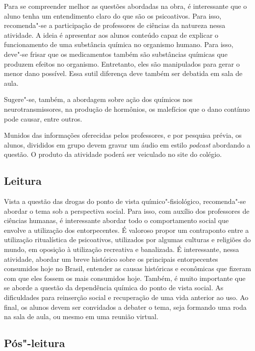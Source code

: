 \documentclass{article}
\begin{document}
Para se compreender melhor as questões abordadas na obra, é
interessante que o aluno tenha um entendimento claro do que são os
psicoativos. Para isso, recomenda"-se a participação de professores de
ciências da natureza nessa atividade. A ideia é apresentar aos alunos
conteúdo capaz de explicar o funcionamento de uma substância química no
organismo humano. Para isso, deve"-se frisar que os medicamentos também
são substâncias químicas que produzem efeitos no organismo. Entretanto,
eles são manipulados para gerar o menor dano possível. Essa sutil
diferença deve também ser debatida em sala de aula.

Sugere"-se, também, a abordagem sobre ação dos químicos nos
neurotransmissores, na produção de hormônios, os malefícios que o dano
contínuo pode causar, entre outros.

Munidos das informações oferecidas pelos professores, e por pesquisa
prévia, os alunos, divididos em grupo devem gravar um áudio em estilo
\emph{podcast} abordando a questão. O produto da atividade poderá ser
veiculado no site do colégio.

\subsection{Leitura}

Vista a questão das drogas do ponto de vista
químico"-fisiológico, recomenda"-se abordar o tema sob a perspectiva
social. Para isso, com auxílio dos professores de ciências humanas, é
interessante abordar todo o comportamento social que envolve a
utilização dos entorpecentes. É valoroso propor um contraponto entre a
utilização ritualística de psicoativos, utilizados por algumas culturas
e religiões do mundo, em oposição à utilização recreativa e banalizada.
É interessante, nessa atividade, abordar um breve histórico sobre os
principais entorpecentes consumidos hoje no Brasil, entender as causas
históricas e econômicas que fizeram com que eles fossem os mais
consumidos hoje. Também, é muito importante que se aborde a questão da
dependência química do ponto de vista social. As dificuldades para
reinserção social e recuperação de uma vida anterior ao uso. Ao final,
os alunos devem ser convidados a debater o tema, seja formando uma roda
na sala de aula, ou mesmo em uma reunião virtual.

\subsection{Pós"-leitura}
\end{document}
